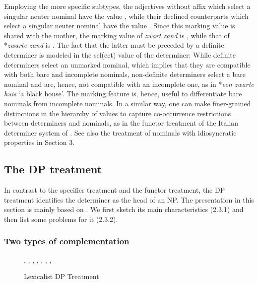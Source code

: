 \documentclass[output=paper]{langsci/langscibook}
\begin{document}
Employing the more specific subtypes, the adjectives without affix which select a singular 
neuter nominal have the value , while their declined counterparts which select 
a singular neuter nominal have the value . 
Since this {\sc marking} value is shared with the mother, the {\sc marking} value 
of \emph{zwart zand} is , while that of *\emph{zwarte zand} is . 
The fact that the latter must be preceded by a definite determiner
is modeled in the {\sc sel(ect)} value of the determiner: 
While definite determiners select an unmarked nominal, which implies that 
they are compatible with both bare and incomplete nominals,
non-definite determiners select a bare nominal and are, hence, not compatible 
with an incomplete one, as in *\emph{een zwarte huis} `a black house'. 
The {\sc marking} feature is, hence, useful to differentiate bare 
nominals from incomplete nominals.  
In a similar way, one can make finer-grained distinctions in the hierarchy of  
 values to capture co-occurrence restrictions between determiners and 
nominals, as in the functor treatment of the Italian determiner system of 
\citet{Allegranza06}. See also the treatment of nominals with idiosyncratic properties 
in Section 3. 


\subsection{The DP treatment} 


In contrast to the specifier treatment and the functor treatment, the DP 
treatment identifies the determiner as the head of an NP. The presentation in this section   
is mainly based on \citet{Netter94}. We first sketch its main characteristics (2.3.1)
and then list some problems for it (2.3.2). 


\subsubsection{Two types of complementation} 


\begin{figure}
\begin{center}
\footnotesize
\tree
{,
  {,
    {}},
  {,
    {,
      {}},
    {, 
      {}}}}
\caption{\label{net} Lexicalist DP Treatment }
\normalsize
\end{center}
\end{figure} 
\end{document}

